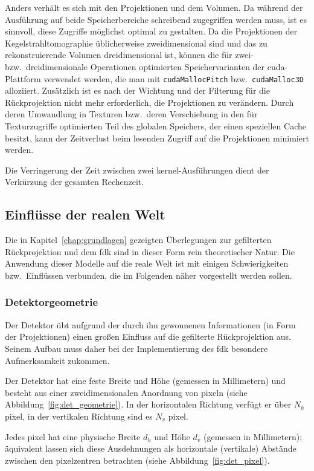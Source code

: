 Anders verhält es sich mit den Projektionen und dem Volumen. Da während der Ausführung auf beide Speicherbereiche
schreibend zugegriffen werden muss, ist es sinnvoll, diese Zugriffe möglichst optimal zu gestalten. Da die Projektionen
der Kegelstrahltomographie üblicherweise zweidimensional sind und das zu rekonstruierende Volumen dreidimensional ist,
können die für zwei- bzw.\ dreidimensionale Operationen optimierten Speichervarianten der \gls{cuda}-Plattform verwendet
werden, die man mit \texttt{cudaMallocPitch} bzw.\ \texttt{cudaMalloc3D} alloziiert. Zusätzlich ist es nach der Wichtung
und der Filterung für die Rückprojektion nicht mehr erforderlich, die Projektionen zu verändern. Durch deren Umwandlung
in Texturen bzw.\ deren Verschiebung in den für Texturzugriffe optimierten Teil des globalen Speichers, der einen
speziellen Cache besitzt, kann der Zeitverlust beim lesenden Zugriff auf die Projektionen minimiert werden.

Die Verringerung der Zeit zwischen zwei \gls{kernel}-Ausführungen dient der Verkürzung der gesamten Rechenzeit.

\subsection{Einflüsse der realen Welt}

Die in Kapitel~\ref{chap:grundlagen} gezeigten Überlegungen zur gefilterten Rückprojektion und dem \gls{fdk} sind in
dieser Form rein theoretischer Natur. Die Anwendung dieser Modelle auf die reale Welt ist mit einigen Schwierigkeiten
bzw.\ Einflüssen verbunden, die im Folgenden näher vorgestellt werden sollen.

\subsubsection{Detektorgeometrie}

Der Detektor übt aufgrund der durch ihn gewonnenen Informationen (in Form der Projektionen) einen großen Einfluss auf
die gefilterte Rückprojektion aus. Seinem Aufbau muss daher bei der Implementierung des \gls{fdk} besondere
Aufmerksamkeit zukommen.

Der Detektor hat eine feste Breite und Höhe (gemessen in Millimetern) und besteht aus einer zweidimensionalen Anordnung
von \gls{pixel}n (siehe Abbildung~\ref{fig:det_geometrie}). In der horizontalen Richtung verfügt er über $N_h$
\gls{pixel}, in der vertikalen Richtung sind es $N_v$ \gls{pixel}.

Jedes \gls{pixel} hat eine physische Breite $d_h$ und Höhe $d_v$ (gemessen in Millimetern); äquivalent lassen sich diese
Ausdehnungen als horizontale (vertikale) Abstände zwischen den \gls{pixel}zentren betrachten (siehe
Abbildung~\ref{fig:det_pixel}).

